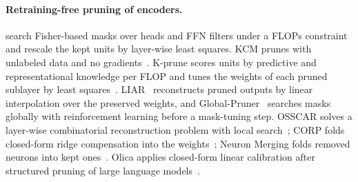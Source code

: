 \documentclass[11pt]{article}
\begin{document}
\paragraph{Retraining-free pruning of encoders.} \citet{kwon2022fast} search Fisher-based masks over heads and FFN
filters under a FLOPs constraint and rescale the kept units by layer-wise least squares. KCM prunes with unlabeled data and
no gradients~\citep{nova2023kcm}. K-prune scores units by predictive and representational knowledge per FLOP and tunes the
weights of each pruned sublayer by least squares~\citep{park2024kprune}. LIAR~\citep{wang2024liar} reconstructs pruned outputs by linear interpolation over the preserved weights, and
Global-Pruner~\citep{yao2024globalpruner} searches masks globally with reinforcement learning before a mask-tuning step.
OSSCAR solves a layer-wise combinatorial
reconstruction problem with local search~\citep{meng2024osscar}; CORP folds closed-form ridge compensation into the
weights~\citep{zhang2026corp}; Neuron Merging folds removed neurons into kept ones~\citep{kim2020neuron}. Olica applies closed-form linear
calibration after structured pruning of large language models~\citep{he2025olica}.
\end{document}
